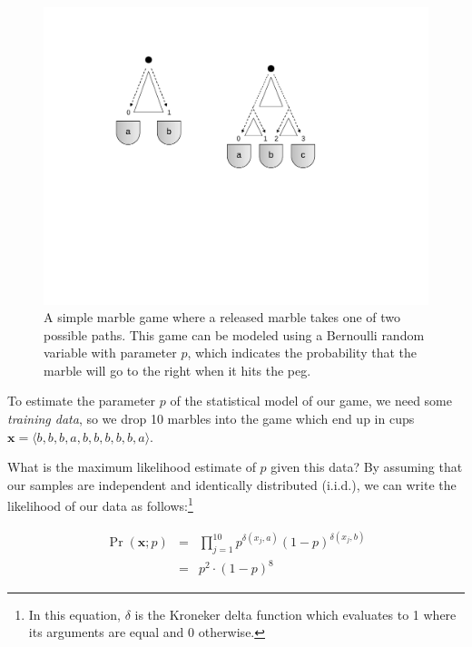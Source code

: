 \begin{figure}
\begin{center}
\vspace{0.2cm}
\includegraphics[scale=0.6]{figures/fig-ch6-em-marble1.pdf}
\vspace{-0.3cm}
\end{center}\caption{A simple marble game where a released marble takes one of two possible paths.  This game can be modeled using a Bernoulli random variable with parameter $p$, which indicates the probability that the marble will go to the right when it hits the peg.}\label{chapter6_figure_plinko}
\end{figure}

To estimate the parameter $p$ of the statistical model of our game, we
need some \emph{training data}, so we drop 10 marbles into the game
which end up in cups $\textbf{x} = \langle
b,b,b,a,b,b,b,b,b,a\rangle$.

What is the maximum likelihood estimate of $p$ given this data?  By
assuming that our samples are independent and identically distributed
(i.i.d.), we can write the likelihood of our data as
follows:\footnote{In this equation, $\delta$ is the Kroneker delta
  function which evaluates to 1 where its arguments are equal and 0
  otherwise.}

\begin{eqnarray*}
\Pr(\textbf{x};p) & = & \prod_{j=1}^{10} p^{\delta(x_j,a)}(1-p)^{\delta(x_j,b)} \\
&  =  & p^2 \cdot (1 - p)^8
\end{eqnarray*}

